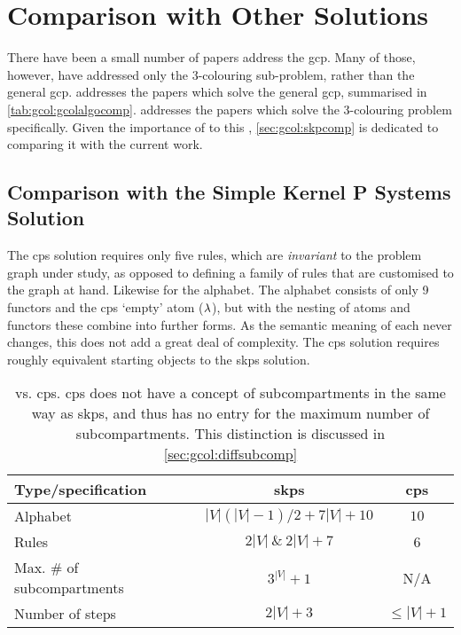 \section{Comparison with Other  Solutions}

There have been a small number of papers address the \gls{gcp}.  Many of those, however, have addressed only the 3-colouring sub-problem, rather than the general \gls{gcp}.   addresses the papers which solve the general \gls{gcp}, summarised in \cref{tab:gcol:gcolalgocomp}.   addresses the papers which solve the 3-colouring problem specifically.  Given the importance of \cite{Gheorghe2013} to this , \cref{sec:gcol:skpcomp} is dedicated to comparing it with the current work.

\subsection{\label{sec:gcol:skpcomp}Comparison with the Simple Kernel P Systems Solution}
The \gls{cps} solution requires only five rules, which are \emph{invariant} to the problem graph under study, as opposed to defining a family of rules that are customised to the graph at hand.  Likewise for the alphabet.  The alphabet consists of only 9 \glspl{functor} and the \gls{cps} `empty' atom (\(\lambda\)), but with the nesting of atoms and \glspl{functor} these combine into further forms.  As the semantic meaning of each never changes, this does not add a great deal of complexity.  The \gls{cps} solution requires roughly equivalent starting objects to the \gls{skps} solution.

\begin{table}
\centering
\begin{tabular}{@{}lcc@{}}
\toprule
Type/specification                & \gls{skps}        & \gls{cps} \\ \midrule
Alphabet                          & \(|V|(|V|-1)/2 + 7|V| + 10\) & \(10\)         \\
Rules                             & \(2|V|~\&~2|V| + 7\)       & 6          \\
Max. \# of subcompartments & \(3^|V| + 1\)             & N/A          \\
Number of steps                   & \(2|V| + 3\)             & \(\leq |V| + 1\)         \\ \bottomrule
\end{tabular}%
\caption[ vs. \gls{cps} comparison]{ vs. \gls{cps}.  \gls{cps} does not have a concept of subcompartments in the same way as \gls{skps}, and thus has no entry for the maximum number of subcompartments.  This distinction is discussed in \cref{sec:gcol:diffsubcomp}}
\label{tab:gcol:skpcomp}
\end{table}

